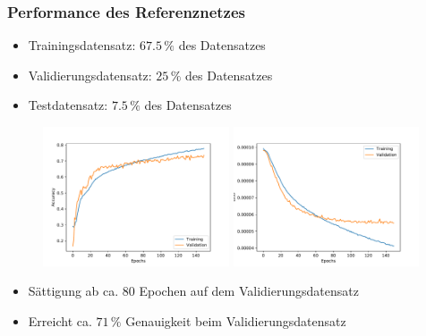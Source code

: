 \documentclass[aspectratio=1610, professionalfonts, 9pt]{beamer}
\begin{document}
\begin{frame}
 \frametitle{Performance des Referenznetzes}

\begin{itemize}
 \item[\textbullet] Trainingsdatensatz: $67.5\,\%$ des Datensatzes
 \item[\textbullet] Validierungsdatensatz: $25\,\%$ des Datensatzes
 \item[\textbullet] Testdatensatz: $7.5\,\%$ des Datensatzes
\end{itemize}


 \begin{figure}
  \centering
  \includegraphics[width=5.5cm]{images/accuracy_history_scan_new.pdf}\hspace{0.5cm}
  \includegraphics[width=5.5cm]{images/loss_history_scan_new.pdf} \\
 \end{figure}
\begin{itemize}
 \item[\textbullet] Sättigung ab ca. 80 Epochen auf dem Validierungsdatensatz
 \item[\textbullet] Erreicht ca. $71\,\%$ Genauigkeit beim Validierungsdatensatz
\end{itemize}


\end{frame}
\end{document}
